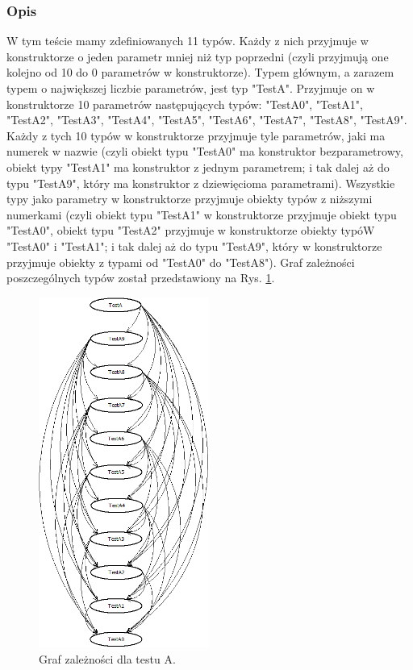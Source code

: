 \documentclass[12pt]{article}
\begin{document}
\subsubsection{Opis}
W tym teście mamy zdefiniowanych 11 typów. Każdy z nich przyjmuje w konstruktorze o jeden parametr mniej niż typ poprzedni (czyli przyjmują one kolejno od 10 do 0 parametrów w konstruktorze). Typem głównym, a zarazem typem o największej liczbie parametrów, jest typ "TestA". Przyjmuje on w konstruktorze 10 parametrów następujących typów: "TestA0", "TestA1", "TestA2", "TestA3", "TestA4", "TestA5", "TestA6", "TestA7", "TestA8", "TestA9". Każdy z tych 10 typów w konstruktorze przyjmuje tyle parametrów, jaki ma numerek w nazwie (czyli obiekt typu "TestA0" ma konstruktor bezparametrowy, obiekt typy "TestA1" ma konstruktor z jednym parametrem; i tak dalej aż do typu "TestA9", który ma konstruktor z dziewięcioma parametrami). Wszystkie typy jako parametry w konstruktorze przyjmuje obiekty typów z niższymi numerkami (czyli obiekt typu "TestA1" w konstruktorze przyjmuje obiekt typu "TestA0", obiekt typu "TestA2" przyjmuje w konstruktorze obiekty typóW "TestA0" i "TestA1"; i tak dalej aż do typu "TestA9", który w konstruktorze przyjmuje obiekty z typami od "TestA0" do "TestA8"). Graf zależności poszczególnych typów został przedstawiony na Rys. \ref{fig:testA}.\\
\begin{figure}[H]
	\begin{center}
  		\includegraphics[height=11.5cm]{TestA.png}
  		\caption{Graf zależności dla testu A.}
  		\label{fig:testA}
	\end{center}
\end{figure}
\end{document}
